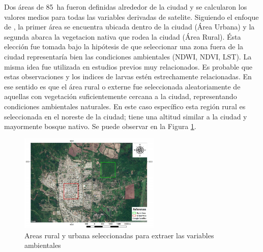   \par Dos áreas de \SI{85}{\hectare} fueron definidas alrededor de la ciudad
    y se calcularon los valores medios para todas las variables derivadas de
    satelite. Siguiendo el enfoque de
    \cite{models_predicting, dynamics_of_dengue, temporal_modeling},
    la primer área se encuentra ubicada dentro de la ciudad
    (Área Urbana) y la segunda abarca la vegetacion nativa que rodea la ciudad
    (Área Rural). Ésta elección fue tomada bajo la hipótesis de que seleccionar
    una zona fuera de la ciudad representaría bien las condiciones ambientales
    (NDWI, NDVI, LST). La misma idea fue utilizada en estudios previos muy
    relacionados. Es probable que estas observaciones y los indices de larvas
    estén estrechamente relacionadas. En ese sentido es que el área rural o
    externe fue seleccionada aleatoriamente de aquellas con vegetación suficientemente
    cercana a la ciudad, representando condiciones ambientales naturales.
    En este caso específico esta región rural es seleccionada en el
    noreste de la ciudad; tiene una altitud similar a la ciudad y mayormente
    bosque nativo. Se puede observar en la Figura \ref{fig:zones}.
    \begin{figure}
    \centering%
    \includegraphics[width=0.6\textwidth]{images/zones}%
    \caption{Areas rural y urbana seleccionadas para extraer las variables ambientales}\label{fig:zones}
    \end{figure}


